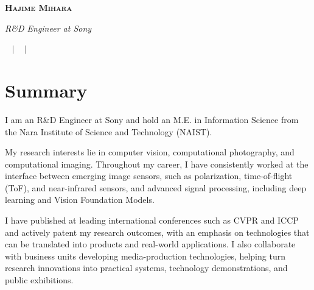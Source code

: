 \documentclass[a4paper,11pt]{article}
\begin{document}
\pagestyle{fancy}
\fancyhf{}
\renewcommand{\headrulewidth}{0pt}
\renewcommand{\footrulewidth}{0pt}
\fancyfoot[L]{\footnotesize\thepage\,/\,\pageref{LastPage}}

\begin{center}
\textbf{\Huge \scshape{Hajime Mihara}}\par\vspace{3pt}
{\small\itshape R\&D Engineer at Sony}\par\vspace{5pt}
\small
\faEnvelope\ \href{mailto:Hajime.Mihara@sony.com}{\underline{}} $|$
\faEnvelope\ \href{mailto:hajimemihara1108@gmail.com}{\underline{}} $|$
\faLinkedin\ \href{https://www.linkedin.com/in/hajimemihara/}{\underline{}}
\end{center}

\section{Summary}
 {\small
 I am an R\&D Engineer at Sony and hold an M.E. in Information Science from the Nara Institute of Science and Technology (NAIST).\par\vspace{4pt}
 My research interests lie in computer vision, computational photography, and computational imaging. Throughout my career, I have consistently worked at the interface between emerging image sensors, such as polarization, time-of-flight (ToF), and near-infrared sensors, and advanced signal processing, including deep learning and Vision Foundation Models.\par\vspace{4pt}
 I have published at leading international conferences such as CVPR and ICCP and actively patent my research outcomes, with an emphasis on technologies that can be translated into products and real-world applications. I also collaborate with business units developing media-production technologies, helping turn research innovations into practical systems, technology demonstrations, and public exhibitions.
 \par}

\end{document}
